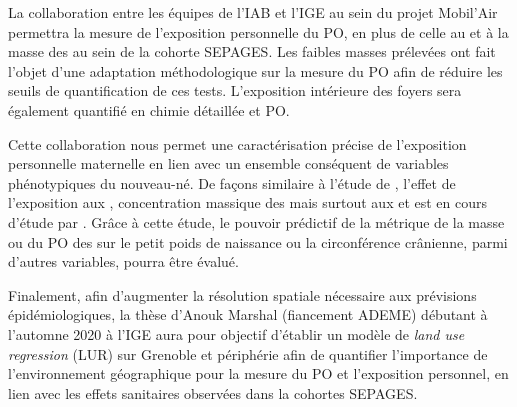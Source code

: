 La collaboration entre les équipes de l'IAB et l'IGE au sein du projet Mobil'Air permettra la mesure de l'exposition personnelle
du PO, en plus de celle au  et à la masse des \PMdc au sein de la cohorte SEPAGES. Les faibles masses prélevées
ont fait l'objet d'une adaptation méthodologique sur la mesure du PO afin de réduire les
seuils de quantification de ces tests.
L'exposition intérieure des foyers sera également quantifié en chimie détaillée et PO.

Cette collaboration nous permet une caractérisation précise de
l'exposition personnelle maternelle en lien avec un ensemble conséquent de variables
phénotypiques du nouveau-né.
De façons similaire à l'étude de \cite{ouidirEstimation2015}, l'effet de l'exposition aux
, concentration massique des \PMdc{} mais surtout aux \POAAv{} et \PODTTv{} est en
cours d'étude par \cite{borlazaPersonalinprep.}.
Grâce à cette étude, le pouvoir prédictif de la métrique de la masse ou du PO des \PMdc{}
sur le petit poids de naissance ou la circonférence crânienne, parmi d'autres variables,
pourra être évalué.

Finalement, afin d'augmenter la résolution spatiale nécessaire aux prévisions
épidémiologiques, la thèse d'Anouk Marshal (fiancement ADEME) débutant à l'automne 2020 à
l'IGE aura pour objectif d'établir un modèle de \textit{land use regression} (LUR) sur
Grenoble et périphérie afin de quantifier l'importance de l'environnement géographique
pour la mesure du PO et l'exposition personnel, en lien avec les effets sanitaires
observées dans la cohortes SEPAGES.

%


